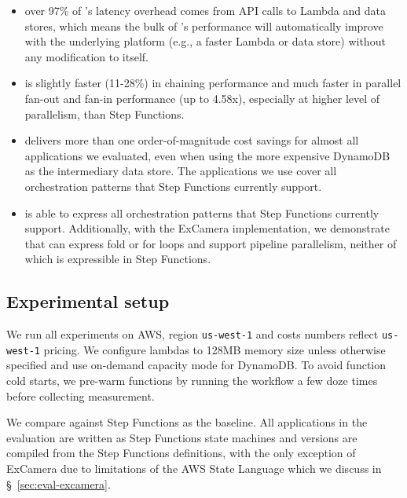 \begin{itemize}

    \item over 97\% of \name{}'s latency overhead comes from API calls to
    Lambda and data stores, which means the bulk of \name{}'s performance will
    automatically improve with the underlying platform (e.g., a faster Lambda
    or data store) without any modification to \name{} itself.


    \item \name{} is slightly faster (11-28\%) in chaining performance and
    much faster in parallel fan-out and fan-in performance (up to 4.58x),
    especially at higher level of parallelism, than Step Functions.

    \item \name{} delivers more than one order-of-magnitude cost savings for
    almost all applications we evaluated, even when using the more expensive
    DynamoDB as the intermediary data store. The applications we use cover all
    orchestration patterns that Step Functions currently support.

    \item \name{} is able to express all orchestration patterns that Step
    Functions currently support. Additionally, with the ExCamera
    implementation, we demonstrate that \name{} can express fold or for loops
    and support pipeline parallelism, neither of which is expressible in Step
    Functions.

\end{itemize}

\subsection{Experimental setup}

We run all experiments on AWS, region \texttt{us-west-1} and costs numbers
reflect \texttt{us-west-1} pricing. We configure lambdas to 128MB memory size
unless otherwise specified and use on-demand capacity mode for DynamoDB. To
avoid function cold starts, we pre-warm functions by running the workflow a
few doze times before collecting measurement.


We compare against Step Functions as the baseline. All applications in the
evaluation are written as Step Functions state machines and \name{} versions
are compiled from the Step Functions definitions, with the only exception of
ExCamera due to limitations of the AWS State Language which we discuss in
\S~\ref{sec:eval-excamera}.

